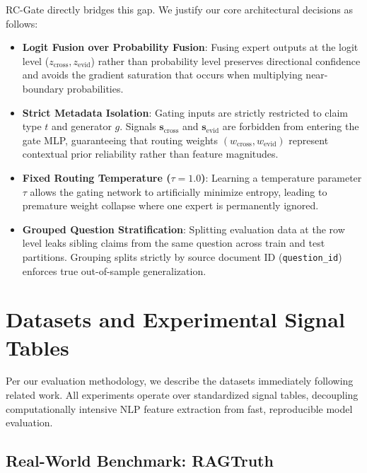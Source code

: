 \documentclass[pdflatex,sn-mathphys,Numbered]{sn-jnl}
\begin{document}
RC-Gate directly bridges this gap. We justify our core architectural decisions as follows:
\begin{itemize}
    \item \textbf{Logit Fusion over Probability Fusion}: Fusing expert outputs at the logit level ($z_{\mathrm{cross}}, z_{\mathrm{evid}}$) rather than probability level preserves directional confidence and avoids the gradient saturation that occurs when multiplying near-boundary probabilities.
    \item \textbf{Strict Metadata Isolation}: Gating inputs are strictly restricted to claim type $t$ and generator $g$. Signals $\mathbf{s}_{\mathrm{cross}}$ and $\mathbf{s}_{\mathrm{evid}}$ are forbidden from entering the gate MLP, guaranteeing that routing weights $(w_{\mathrm{cross}}, w_{\mathrm{evid}})$ represent contextual prior reliability rather than feature magnitudes.
    \item \textbf{Fixed Routing Temperature ($\tau = 1.0$)}: Learning a temperature parameter $\tau$ allows the gating network to artificially minimize entropy, leading to premature weight collapse where one expert is permanently ignored.
    \item \textbf{Grouped Question Stratification}: Splitting evaluation data at the row level leaks sibling claims from the same question across train and test partitions. Grouping splits strictly by source document ID (\texttt{question\_id}) enforces true out-of-sample generalization.
\end{itemize}

\section{Datasets and Experimental Signal Tables}\label{sec:datasets}

Per our evaluation methodology, we describe the datasets immediately following related work. All experiments operate over standardized signal tables, decoupling computationally intensive NLP feature extraction from fast, reproducible model evaluation.

\subsection{Real-World Benchmark: RAGTruth}\label{subsec:ragtruth_ds}
\end{document}
